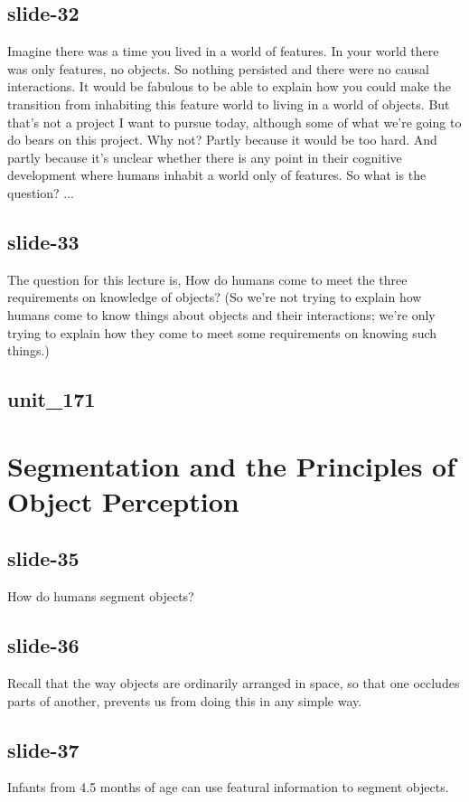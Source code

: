 \documentclass[12pt,\papersize]{extarticle}
\begin{document}
 
\subsection{slide-32}
Imagine there was a time you lived in a world of features. In your world there was only features, no objects.
So nothing persisted and there were no causal interactions.
It would be fabulous to be able to explain how you could make the transition from inhabiting this feature world to living in a world of objects.
But that's not a project I want to pursue today, although some of what we're going to do bears on this project.
Why not? Partly because it would be too hard. And partly because it's unclear whether there is any point in their cognitive development where humans inhabit a world only of features.
So what is the question? ...
 
 
\subsection{slide-33}
The question for this lecture is, How do humans come to meet the three requirements on knowledge of objects?
(So we're not trying to explain how humans come to know things about objects and their interactions; we're only trying to explain how they come to meet some requirements on knowing such things.)
 
 
\subsection{unit\_171}
 
\section{Segmentation and the Principles of Object Perception}
 
 
\subsection{slide-35}
How do humans segment objects?
 
 
\subsection{slide-36}
Recall that the way objects are ordinarily arranged in space, so that one occludes parts of another, prevents us from doing this in any simple way.
 
 
\subsection{slide-37}
Infants from 4.5 months of age can use featural information to segment objects.
 
\end{document}
